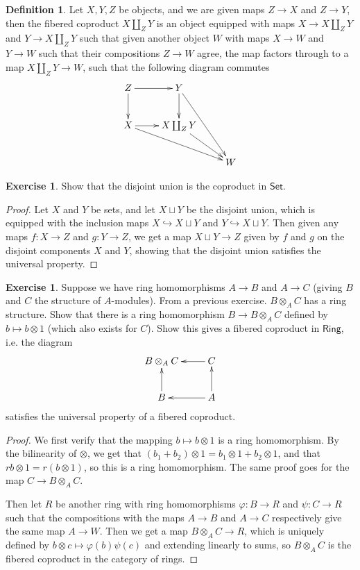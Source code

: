\documentclass[psamsfonts]{amsart}
\theoremstyle{definition}
\newtheorem{defn}[thm]{Definition}
\newtheorem{exer}[thm]{Exercise}
\theoremstyle{remark}
\begin{document}
%
\begin{defn}
Let $X,Y,Z$ be objects, and we are given maps $Z \to X$ and $Z \to Y$, then the fibered coproduct $X \coprod_Z Y$ is an object equipped with maps $X \to X \coprod_Z Y$ and $Y \to X \coprod_Z Y$ such that given another object $W$ with maps $X \to W$ and $Y \to W$ such that their compositions $Z \to W$ agree, the map factors through to a map $X \coprod_Z Y \to W$, such that the following diagram commutes
$$\xymatrix{
Z \ar[d] \ar[r] & Y \ar[d] \ar[ddr]\\
X \ar[r] \ar[drr] & X \coprod_Z Y  \ar[dr]\\
& & W
}$$
\end{defn}
%
\begin{exer}
Show that the disjoint union is the coproduct in $\mathsf{Set}$.
\end{exer}
%
\begin{proof}
Let $X$ and $Y$ be sets, and let $X \sqcup Y$ be the disjoint union, which is equipped with the inclusion maps $X \hookrightarrow X \sqcup Y$ and $Y \hookrightarrow X \sqcup Y$. Then given any maps $f: X \to Z$ and $g: Y \to Z$, we get a map $X \sqcup Y \to Z$ given by $f$ and $g$ on the disjoint components $X$ and $Y$, showing that the disjoint union satisfies the universal property.
\end{proof}
%
\begin{exer}
Suppose we have ring homomorphisms $A \to B$ and $A \to C$ (giving $B$ and $C$ the structure of $A$-modules). From a previous exercise. $B \otimes_A C$ has a ring structure. Show that there is a ring homomorphism $B \to B \otimes_A C$ defined by $b \mapsto b \otimes 1$ (which also exists for $C$). Show this gives a fibered coproduct in $\mathsf{Ring}$, i.e. the diagram
$$\xymatrix{
B \otimes_A C & C \ar[l] \\
B \ar[u] & A \ar[l] \ar[u]
}$$
satisfies the universal property of a fibered coproduct.
\end{exer}
%
\begin{proof}
We first verify that the mapping $b \mapsto b \otimes 1$ is a ring homomorphism. By the bilinearity of $\otimes$, we get that $(b_1 + b_2) \otimes 1 = b_1 \otimes 1 + b_2 \otimes 1$, and that $rb \otimes 1 = r(b \otimes 1)$, so this is a ring homomorphism. The same proof goes for the map $C \to B \otimes_A C$.

Then let $R$ be another ring with ring homomorphisms $\varphi: B \to R$ and $\psi: C \to R$ such that the compositions with the maps $A \to B$ and $A \to C$ respectively give the same map $A \to W$. Then we get a map $B \otimes_A C \to R$, which is uniquely defined by $b \otimes c \mapsto \varphi(b)\psi(c)$ and extending linearly to sums, so $B \otimes_A C$ is the fibered coproduct in the category of rings.
\end{proof}
\end{document}
